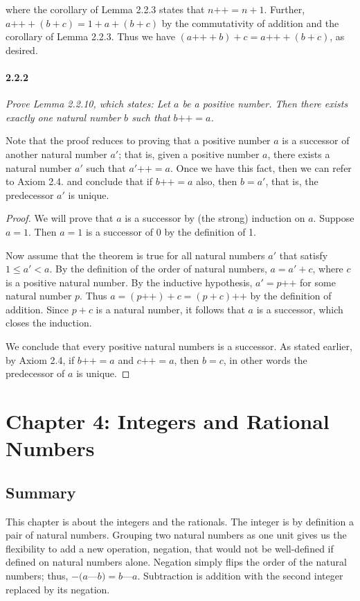 \documentclass{article}
\newcommand{\pp}{{\texttt{++}}}
\begin{document}
where the corollary of Lemma 2.2.3 states that $n\pp = n + 1$.  Further, $a\pp + (b + c) = 1 + a + (b+c)$ by the commutativity of addition and the corollary of Lemma 2.2.3. Thus we have $(a\pp + b) + c = a\pp + (b + c)$, as desired.

\paragraph{2.2.2} \textit{Prove Lemma 2.2.10, which states: Let $a$ be a positive number. Then there exists exactly one natural number $b$ such that $b\pp = a$.}

Note that the proof reduces to proving that a positive number $a$ is a successor of another natural number $a'$; that is, given a positive number $a$, there exists a natural number $a'$ such that $a'\pp = a$. Once we have this fact, then we can refer to Axiom 2.4. and conclude that if $b\pp = a$ also, then $b = a'$, that is, the predecessor $a'$ is unique.

\begin{proof}
We will prove that $a$ is a successor by (the strong) induction on $a$. Suppose $a = 1$. Then $a = 1$ is a successor of $0$ by the definition of 1. 

Now assume that the theorem is true for all natural numbers $a'$ that satisfy $1 \leq a' < a$. By the definition of the order of natural numbers, $a = a' + c$, where $c$ is a positive natural number. By the inductive hypothesis, $a' = p\pp$ for some natural number $p$. Thus $a = (p\pp) + c = (p + c)\pp$ by the definition of addition. Since $p+c$ is a natural number, it follows that $a$ is a successor, which closes the induction.

We conclude that every positive natural numbers is a successor. As stated earlier, by Axiom 2.4, if $b\pp = a$ and $c\pp = a$, then $b = c$, in other words the predecessor of $a$ is unique.
\end{proof}


\section*{Chapter 4: Integers and Rational Numbers}

\subsection*{Summary}
This chapter is about the integers and the rationals. The integer is by definition a pair of natural numbers. Grouping two natural numbers as one unit gives us the flexibility to add a new operation, negation, that would not be well-defined if defined on natural numbers alone. Negation simply flips the order of the natural numbers; thus, $-(a$---$b) = b$---$a$. Subtraction is addition with the second integer replaced by its negation.
\end{document}
